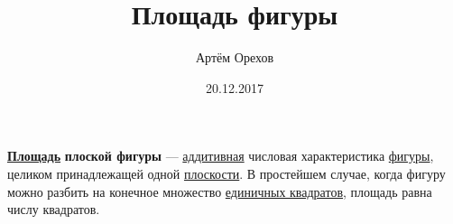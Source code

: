 \documentclass[a4paper,8pt,leqno]{article}
\author{Артём Орехов}
\title{Площадь фигуры}
\date{20.12.2017}
\theoremstyle{plain}
\theoremstyle{definition} %
\theoremstyle{remark} %
\begin{document}
	\maketitle
	\href{https://ru.wikipedia.org/wiki/\%D0\%9F\%D0\%BB\%D0\%BE\%D1\%89\%D0\%B0\%D0\%B4\%D1\%8C}{\textbf{Площадь}} \textbf{плоской фигуры} — \href{https://ru.wikipedia.org/wiki/\%D0\%90\%D0\%B4\%D0\%B4\%D0\%B8\%D1\%82\%D0\%B8\%D0\%B2\%D0\%BD\%D0\%BE\%D1\%81\%D1\%82\%D1\%8C}{аддитивная} числовая характеристика \href{https://ru.wikipedia.org/wiki/\%D0\%A4\%D0\%B8\%D0\%B3\%D1\%83\%D1\%80\%D0\%B0\_(\%D0\%B3\%D0\%B5\%D0\%BE\%D0\%BC\%D0\%B5\%D1\%82\%D1\%80\%D0\%B8\%D1\%8F)}{фигуры}, целиком принадлежащей одной \href{https://ru.wikipedia.org/wiki/\%D0\%9F\%D0\%BB\%D0\%BE\%D1\%81\%D0\%BA\%D0\%BE\%D1\%81\%D1\%82\%D1\%8C\_(\%D0\%B3\%D0\%B5\%D0\%BE\%D0\%BC\%D0\%B5\%D1\%82\%D1\%80\%D0\%B8\%D1\%8F)}{плоскости}. В простейшем случае, когда фигуру можно разбить на конечное множество \href{https://ru.wikipedia.org/wiki/\%D0\%95\%D0\%B4\%D0\%B8\%D0\%BD\%D0\%B8\%D1\%87\%D0\%BD\%D1\%8B\%D0\%B9\_\%D0\%BA\%D0\%B2\%D0\%B0\%D0\%B4\%D1\%80\%D0\%B0\%D1\%82}{единичных квадратов}, площадь равна числу квадратов.
	\tableofcontents
\end{document}
